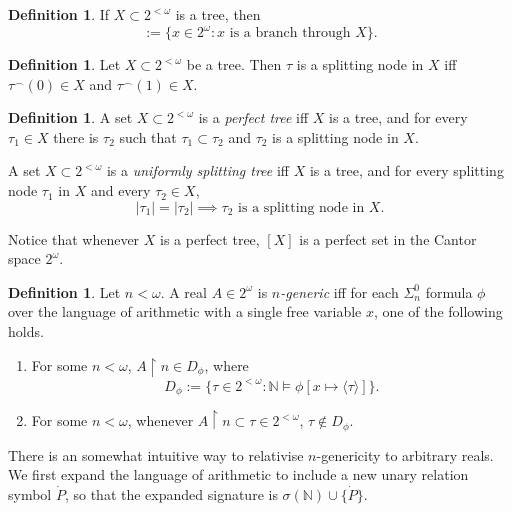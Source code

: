 \documentclass[12pt, twoside]{memoir}
\numberwithin{equation}{section}
\theoremstyle{definition}
\newtheorem{defi}[thm]{Definition}
\theoremstyle{remark}
\theoremstyle{definition}
\theoremstyle{definition}
\theoremstyle{definition}
\theoremstyle{remark}
\begin{document}
\begin{defi}
If $X \subset 2^{< \omega}$ is a tree, then
\begin{equation*}
    [X] := \{x \in 2^{\omega} : x \text{ is a branch through } X\} \text{.}
\end{equation*}
\end{defi}

\begin{defi}
Let $X \subset 2^{< \omega}$ be a tree. Then $\tau$ is a splitting node in $X$ iff $\tau^\frown (0) \in X$ and $\tau^\frown (1) \in X$.
\end{defi}

\begin{defi}
A set $X \subset 2^{< \omega}$ is a \emph{perfect tree} iff $X$ is a tree, and for every $\tau_1 \in X$ there is $\tau_2$ such that $\tau_1 \subset \tau_2$ and $\tau_2$ is a splitting node in $X$.

A set $X \subset 2^{< \omega}$ is a \emph{uniformly splitting tree} iff $X$ is a tree, and for every splitting node $\tau_1$ in $X$ and every $\tau_2 \in X$, 
\begin{equation*}
    |\tau_1| = |\tau_2| \implies \tau_2 \text{ is a splitting node in } X \text{.}
\end{equation*}
\end{defi}

Notice that whenever $X$ is a perfect tree, $[X]$ is a perfect set in the Cantor space $2^{\omega}$.

\begin{defi}
Let $n < \omega$. A real $A \in 2^{\omega}$ is $n$\emph{-generic} iff for each $\Sigma^0_n$ formula $\phi$ over the language of arithmetic with a single free variable $x$, one of the following holds.
\begin{enumerate}[label=(\alph*)]
    \item For some $n < \omega$, $A \restriction n \in D_{\phi}$, where $$D_{\phi} := \{\tau \in 2^{< \omega} : \mathbb{N} \models \phi[x \mapsto \langle \tau \rangle]\} \text{.}$$
    \item For some $n < \omega$, whenever $A \restriction n \subset \tau \in 2^{< \omega}$, $\tau \not\in D_{\phi}$.
\end{enumerate}
\end{defi}

There is an somewhat intuitive way to relativise $n$-genericity to arbitrary reals. We first expand the language of arithmetic to include a new unary relation symbol $\dot{P}$, so that the expanded signature is $\sigma(\mathbb{N}) \cup \{\dot{P}\}$.
\end{document}
